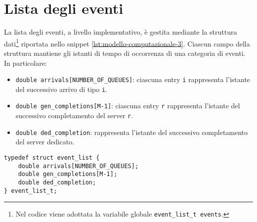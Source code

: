 \section{Lista degli eventi}\label{sec:modello-computazionale-lista-eventi}
La lista degli eventi, a livello implementativo, è gestita mediante la struttura dati\footnote{Nel codice viene adottata la variabile globale \texttt{{\color{code_purple}event\_list\_t} events}.} riportata nello snippet \ref{lst:modello-computazionale-3}.
Ciascun campo della struttura mantiene gli istanti di tempo di occorrenza di una categoria di eventi. In particolare:
\begin{itemize}
\item \texttt{{\color{code_purple}double} arrivals[NUMBER\_OF\_QUEUES]}: ciascuna entry \texttt{i} rappresenta l'istante del successivo arrivo di tipo \texttt{i}.
\item \texttt{{\color{code_purple}double} gen\_completions[M-1]}: ciascuna entry \texttt{r} rappresenta l'istante del successivo completamento del server \texttt{r}.
\item \texttt{{\color{code_purple}double} ded\_completion}: rappresenta l'istante del successivo completamento del server dedicato.
\end{itemize}

\begin{lstlisting}[label={lst:modello-computazionale-3}, caption={Struttura dati per la lista degli eventi}]
typedef struct event_list {
    double arrivals[NUMBER_OF_QUEUES];  
    double gen_completions[M-1];               
    double ded_completion;                         
} event_list_t; 
\end{lstlisting}

